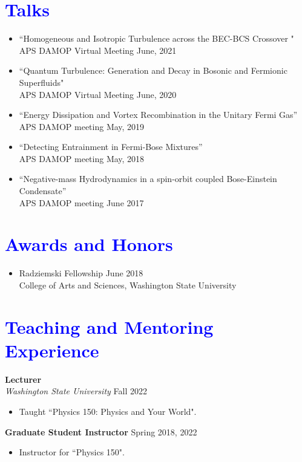 \documentclass[10pt,fleqn]{scrartcl}
\begin{document}
\section*{\textcolor{blue}{Talks}}
\begin{itemize}
\item ``Homogeneous and Isotropic Turbulence across the BEC-BCS Crossover " \\
			APS DAMOP Virtual Meeting \hfill June, 2021
\item ``Quantum Turbulence: Generation and Decay in Bosonic and Fermionic Superfluids" \\
			APS DAMOP Virtual Meeting \hfill June, 2020
\item ``Energy Dissipation and Vortex Recombination in the Unitary Fermi Gas''\\
             APS DAMOP meeting   \hfill May, 2019
\item  ``Detecting Entrainment in Fermi-Bose Mixtures''\\
		APS DAMOP meeting        \hfill May, 2018
\item ``Negative-mass Hydrodynamics in a spin-orbit coupled Bose-Einstein 
	Condensate'' \\
      APS DAMOP meeting          \hfill June 2017
\end{itemize}

\noindent
\section*{\textcolor{blue}{Awards and Honors}}
\begin{itemize}
  \item Radziemski Fellowship   \hfill June 2018 \\
  		College of Arts and Sciences, Washington State University
\end{itemize} 

\noindent
\section*{\textcolor{blue}{Teaching and Mentoring Experience}}
\textbf{Lecturer} \\ 
\textit{ Washington State University}                               \hfill{Fall 2022}
\begin{itemize}
    \item Taught ``Physics 150: Physics and Your World".
\end{itemize}
\textbf{Graduate Student Instructor}            \hfill{Spring 2018, 2022}
\begin{itemize}
\item Instructor for ``Physics 150".
\end{itemize}                                                
\end{document}

